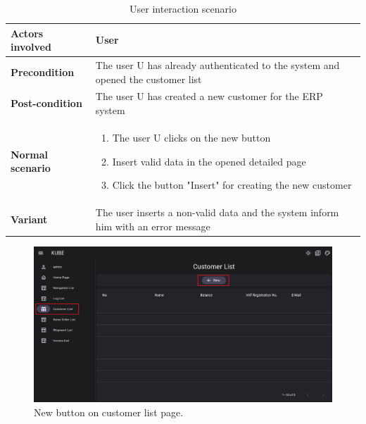 \begin{table}
    \centering
    \begin{tabular}{|l|p{10cm}|}
        \hline
        \textbf{Actors involved} & User                                                                              \\
        \hline
        \textbf{Precondition}    & The user U has already authenticated to the system and opened the customer list   \\
        \hline
        \textbf{Post-condition}  & The user U has created a new customer for the ERP system                          \\
        \hline
        \textbf{Normal scenario} &
        \begin{enumerate}
            \item The user U clicks on the new button
            \item Insert valid data in the opened detailed page
            \item Click the button "Insert" for creating the new customer
        \end{enumerate}                                                 \\
        \hline
        \textbf{Variant}         & The user inserts a non-valid data and the system inform him with an error message \\
        \hline
    \end{tabular}
    \caption{User interaction scenario}
    \label{tab:5_user_interaction}
\end{table}

\begin{figure}
    \centering
    \includegraphics[scale=0.4]{Pictures/5_customer1.png}
    \caption{New button on customer list page.}
    \label{fig:5_customer_1}
\end{figure}

